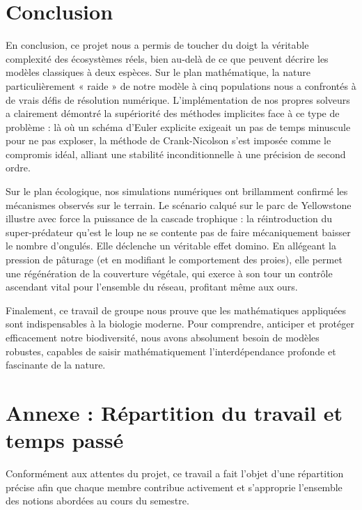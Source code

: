 \documentclass[12pt,a4paper]{article}
\begin{document}
\section{Conclusion}

En conclusion, ce projet nous a permis de toucher du doigt la véritable complexité des écosystèmes réels, bien au-delà de ce que peuvent décrire les modèles classiques à deux espèces. Sur le plan mathématique, la nature particulièrement « raide » de notre modèle à cinq populations nous a confrontés à de vrais défis de résolution numérique. L'implémentation de nos propres solveurs a clairement démontré la supériorité des méthodes implicites face à ce type de problème : là où un schéma d'Euler explicite exigeait un pas de temps minuscule pour ne pas exploser, la méthode de Crank-Nicolson s'est imposée comme le compromis idéal, alliant une stabilité inconditionnelle à une précision de second ordre.

Sur le plan écologique, nos simulations numériques ont brillamment confirmé les mécanismes observés sur le terrain. Le scénario calqué sur le parc de Yellowstone illustre avec force la puissance de la cascade trophique : la réintroduction du super-prédateur qu'est le loup ne se contente pas de faire mécaniquement baisser le nombre d'ongulés. Elle déclenche un véritable effet domino. En allégeant la pression de pâturage (et en modifiant le comportement des proies), elle permet une régénération de la couverture végétale, qui exerce à son tour un contrôle ascendant vital pour l'ensemble du réseau, profitant même aux ours. 

Finalement, ce travail de groupe nous prouve que les mathématiques appliquées sont indispensables à la biologie moderne. Pour comprendre, anticiper et protéger efficacement notre biodiversité, nous avons absolument besoin de modèles robustes, capables de saisir mathématiquement l'interdépendance profonde et fascinante de la nature.

\newpage
\appendix
\section{Annexe : Répartition du travail et temps passé}

Conformément aux attentes du projet, ce travail a fait l'objet d'une répartition précise afin que chaque membre contribue activement et s'approprie l'ensemble des notions abordées au cours du semestre.
\end{document}
